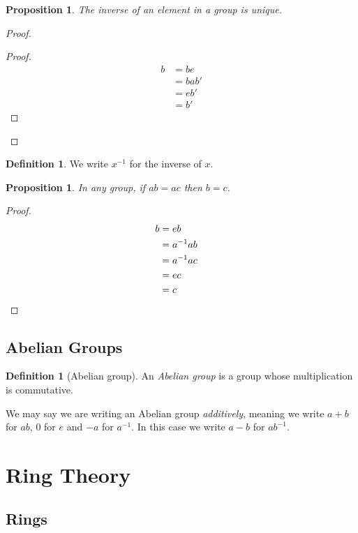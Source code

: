 \documentclass{book}
\let\qed\relax
\newtheorem{prop}[ax]{Proposition}
\theoremstyle{definition}
\newtheorem{df}[ax]{Definition}
\begin{document}
\begin{prop}
The inverse of an element in a group is unique.
\end{prop}

\begin{proof}
\pf
{}
\begin{proof}
	\pf
	\begin{align*}
		b & = be \\
		& = bab' \\
		& = eb' \\
		& = b'
	\end{align*}
\end{proof}
\qed
\end{proof}

\begin{df}
We write $x^{-1}$ for the inverse of $x$.
\end{df}

\begin{prop}
\label{prop:groupcancel}
In any group, if $ab = ac$ then $b = c$.
\end{prop}

\begin{proof}
\pf
\begin{align*}
b & = eb \\
& = a^{-1}ab \\
& = a^{-1}ac \\
& = ec \\
& = c & \qed
\end{align*}
\end{proof}

\section{Abelian Groups}

\begin{df}[Abelian group]
An \emph{Abelian group} is a group whose multiplication is commutative.

We may say we are writing an Abelian group \emph{additively}, meaning we write $a + b$ for $ab$, $0$ for $e$ and $-a$ for $a^{-1}$. In this case we write $a-b$ for $ab^{-1}$.
\end{df}

\chapter{Ring Theory}

\section{Rings}
\end{document}
